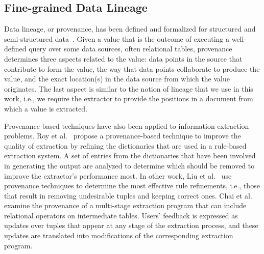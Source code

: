 \subsection{Fine-grained Data Lineage} 
Data lineage, or provenance, has been defined and formalized for structured and semi-structured data~\cite{DBLP:conf/icdt/BunemanKT01,DBLP:journals/ftdb/CheneyCT09}. Given a value that is the outcome  of executing a well-defined query over some data sources, often relational tables, provenance determines three aspects related to the value: data points in the source that contribute to form the value, the way that data points collaborate to produce the value, and the exact location(s) in the data source from which the value originates. The last aspect is similar to the notion of lineage that we use in this work, i.e., we require the extractor to provide the positions in a document from which a value is extracted.

Provenance-based techniques have also been applied to information extraction problems. Roy et al.~\cite{roy2013provenance} propose a provenance-based technique to improve the quality of extraction by refining the dictionaries that are used in a rule-based extraction system. A set of entries from the dictionaries that have been involved in generating the output are analyzed to determine which should be removed to improve the extractor's performance most.  In other work, Liu et al.~\cite{liu2010automatic} use provenance techniques to determine the most effective rule refinements, i.e., those that result in removing undesirable tuples and keeping correct ones.
Chai et al.~\cite{DBLP:conf/sigmod/ChaiVDN09} examine the provenance of a multi-stage extraction program that can include relational operators on intermediate tables. Users' feedback is expressed as updates over tuples that appear at any stage of the extraction process, and these updates are translated into modifications of the corresponding extraction program.    

